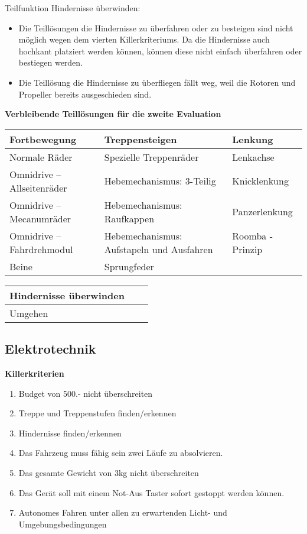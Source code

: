 Teilfunktion Hindernisse überwinden:
\begin{itemize}
    \item Die Teillösungen die Hindernisse zu überfahren oder zu besteigen sind nicht möglich wegen dem vierten Killerkriteriums. Da die Hindernisse auch hochkant platziert werden können, können diese nicht einfach überfahren oder bestiegen werden.
    \item Die Teillösung die Hindernisse zu überfliegen fällt weg, weil die Rotoren und Propeller bereits ausgeschieden sind.
 \end{itemize}

\textbf{Verbleibende Teillösungen für die zweite Evaluation}

\begin{longtable}[h]{l p{7cm} l}
\textbf{Fortbewegung} & \textbf{Treppensteigen} & \textbf{Lenkung} 
\tabularnewline
\endhead
Normale Räder & Spezielle Treppenräder & Lenkachse 
\tabularnewline
Omnidrive – Allseitenräder & Hebemechanismus: 3-Teilig & Knicklenkung 
\tabularnewline
Omnidrive – Mecanumräder & Hebemechanismus: Raufkappen & Panzerlenkung 
\tabularnewline
Omnidrive – Fahrdrehmodul & Hebemechanismus: Aufstapeln und Ausfahren & Roomba - Prinzip 
\tabularnewline
Beine & Sprungfeder &
\end{longtable}

\begin{longtable}[h]{l p{7cm} l}
\textbf{Hindernisse überwinden} 
\tabularnewline
\endhead
Umgehen
\end{longtable}
\newpage


\subsection{Elektrotechnik}
\textbf{Killerkriterien}
\begin{enumerate} 
    \item Budget von 500.- nicht überschreiten
	\item Treppe und Treppenstufen finden/erkennen
	\item Hindernisse finden/erkennen
	\item Das Fahrzeug muss fähig sein zwei Läufe zu absolvieren.
	\item Das gesamte Gewicht von 3kg nicht überschreiten
	\item Das Gerät soll mit einem Not-Aus Taster sofort gestoppt werden können. 
	\item Autonomes Fahren unter allen zu erwartenden Licht- und Umgebungsbedingungen 
\end{enumerate}

